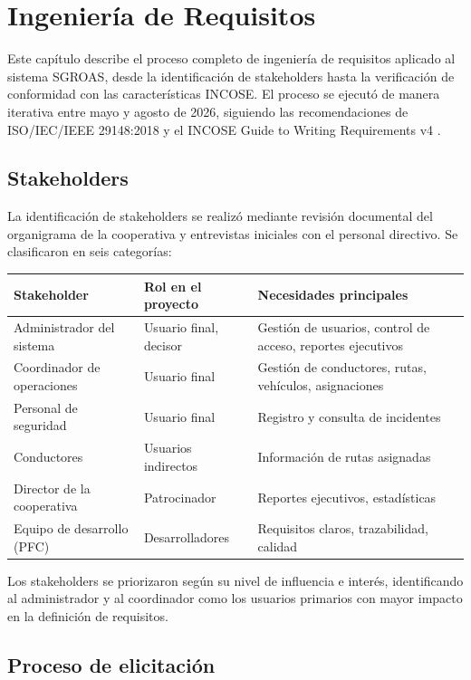 \chapter{Ingeniería de Requisitos}
\label{cap:req-engineering}

Este capítulo describe el proceso completo de ingeniería de requisitos aplicado al sistema SGROAS, desde la identificación de stakeholders hasta la verificación de conformidad con las características INCOSE. El proceso se ejecutó de manera iterativa entre mayo y agosto de 2026, siguiendo las recomendaciones de ISO/IEC/IEEE 29148:2018 \cite{iso29148} y el INCOSE Guide to Writing Requirements v4 \cite{incose}.

\section{Stakeholders}
\label{sec:stakeholders}

La identificación de stakeholders se realizó mediante revisión documental del organigrama de la cooperativa y entrevistas iniciales con el personal directivo. Se clasificaron en seis categorías:

\begin{longtable}{@{}p{3.5cm}p{3cm}p{8cm}@{}}
\toprule
\textbf{Stakeholder} & \textbf{Rol en el proyecto} & \textbf{Necesidades principales} \\
\midrule
\endhead
Administrador del sistema & Usuario final, decisor & Gestión de usuarios, control de acceso, reportes ejecutivos \\
Coordinador de operaciones & Usuario final & Gestión de conductores, rutas, vehículos, asignaciones \\
Personal de seguridad & Usuario final & Registro y consulta de incidentes \\
Conductores & Usuarios indirectos & Información de rutas asignadas \\
Director de la cooperativa & Patrocinador & Reportes ejecutivos, estadísticas \\
Equipo de desarrollo (PFC) & Desarrolladores & Requisitos claros, trazabilidad, calidad \\
\bottomrule
\end{longtable}

Los stakeholders se priorizaron según su nivel de influencia e interés, identificando al administrador y al coordinador como los usuarios primarios con mayor impacto en la definición de requisitos.

\section{Proceso de elicitación}
\label{sec:elicitation}

